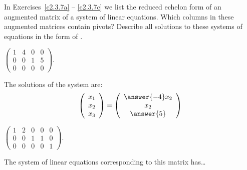 \documentclass{ximera}
\begin{document}
\noindent In Exercises~\ref{c2.3.7a} -- \ref{c2.3.7c} we list
the reduced echelon form of an augmented matrix of a system of
linear equations.  Which columns in these augmented matrices
contain pivots?  Describe all solutions to these systems of
equations in the form of .
\begin{exercise} \label{c2.3.7a}
$\left(\begin{array}{rrr|r}
 1  &  4 & 0 & 0\\
 0  &  0 & 1 & 5\\
 0  &  0 & 0 & 0
       \end{array}\right)$.
     \begin{selectAll}
     \end{selectAll}
     
     \begin{exercise}
       The solutions of the system are:
\[
\left(\begin{array}{r} x_1 \\ x_2 \\ x_3\end{array} \right)
= \left(\begin{array}{c} \answer{-4}x_2 \\ x_2 \\ \answer{5}\end{array} \right)
\]
     \end{exercise}
\end{exercise}
\begin{exercise} \label{c2.3.7b}
$\left(\begin{array}{rrrr|r}
 1  &  2 & 0 & 0 & 0\\
 0  &  0 & 1 & 1 & 0\\
 0  &  0 & 0 & 0 & 1
       \end{array}\right)$.
     \begin{selectAll}
     \end{selectAll}
     \begin{exercise}
       The system of linear equations corresponding to this matrix has\ldots
       \begin{multipleChoice}
       \end{multipleChoice}
     \end{exercise}
\end{exercise}
\end{document}
